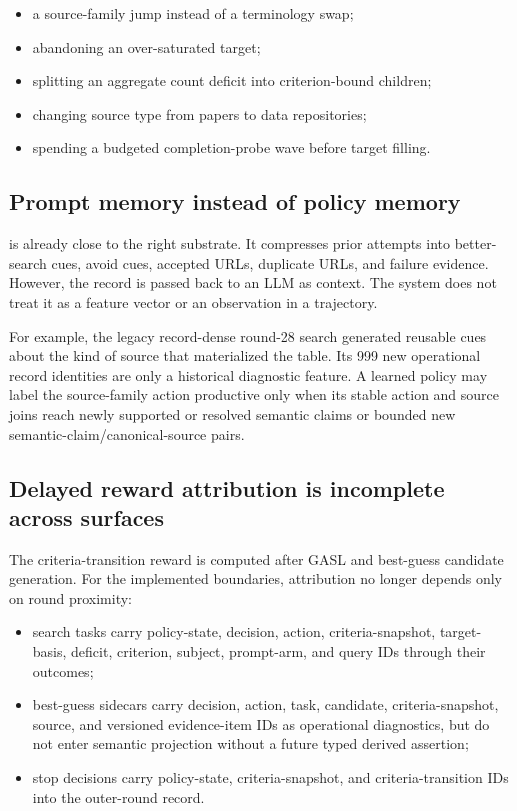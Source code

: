 \documentclass[11pt]{article}
\newcommand{\code}[1]{\path{#1}}
\begin{document}
\begin{itemize}
  \item a source-family jump instead of a terminology swap;
  \item abandoning an over-saturated target;
  \item splitting an aggregate count deficit into criterion-bound children;
  \item changing source type from papers to data repositories;
  \item spending a budgeted completion-probe wave before target filling.
\end{itemize}

\subsection{Prompt memory instead of policy memory}

\code{SearchMemory} is already close to the right substrate.  It compresses
prior attempts into better-search cues, avoid cues, accepted URLs, duplicate
URLs, and failure evidence.  However, the record is passed back to an LLM as
context.  The system does not treat it as a feature vector or an observation in
a trajectory.

For example, the legacy record-dense round-28 search generated reusable cues
about the kind of source that materialized the table.  Its 999 new operational
record identities are only a historical diagnostic feature.  A learned policy
may label the source-family action productive only when its stable action and
source joins reach newly supported or resolved semantic claims or bounded new
semantic-claim/canonical-source pairs.

\subsection{Delayed reward attribution is incomplete across surfaces}

The criteria-transition reward is computed after GASL and best-guess candidate
generation.
For the implemented boundaries, attribution no longer depends only on round
proximity:

\begin{itemize}
  \item search tasks carry policy-state, decision, action, criteria-snapshot,
  target-basis, deficit, criterion, subject, prompt-arm, and query IDs through
  their outcomes;
  \item best-guess sidecars carry decision, action, task, candidate,
  criteria-snapshot, source, and versioned evidence-item IDs as operational
  diagnostics, but do not enter semantic projection without a future typed
  derived assertion;
  \item stop decisions carry policy-state, criteria-snapshot, and
  criteria-transition IDs into the outer-round record.
\end{itemize}
\end{document}
